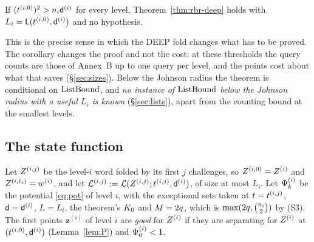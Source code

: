 \begin{corollary}\label{cor:johnson}
If $(t^{(i,0)})^2>n_i\mathsf{d}^{(i)}$ for every level, Theorem~\ref{thm:rbr-deep} holds with $L_i=\mathsf{L}(t^{(i,0)},\mathsf{d}^{(i)})$ and no hypothesis.
\end{corollary}

This is the precise sense in which the DEEP fold changes what has to be proved. The corollary changes the proof and not the cost: at these thresholds the query counts are those of Annex~B up to one query per level, and the points cost about what that saves (\S\ref{sec:sizes}). Below the Johnson radius the theorem is conditional on $\mathrm{ListBound}$, and \emph{no instance of $\mathrm{ListBound}$ below the Johnson radius with a useful $L_i$ is known} (\S\ref{sec:lists}), apart from the counting bound at the smallest levels.

\subsection{The state function}\label{sec:state}

Let $Z^{(i,j)}$ be the level-$i$ word folded by its first $j$ challenges, so $Z^{(i,0)}=Z^{(i)}$ and $Z^{(i,\ell_i)}=w^{(i)}$, and let $\mathcal{L}^{(i,j)}:=\mathcal{L}(Z^{(i,j)};t^{(i,j)},\mathsf{d}^{(i)})$, of size at most $L_i$. Let $\Psi^{(i)}_k$ be the potential \eqref{eq:pot} of level $i$, with the exceptional sets taken at $t=t^{(i,j)}$, $\mathsf{d}=\mathsf{d}^{(i)}$, $L=L_i$, the theorem's $K_0$ and $M=2q$, which is $\max(2q,\binom{n_i}{2})$ by (S3). The first points $\mathbf z^{(i)}$ of level $i$ are \emph{good} for $Z^{(i)}$ if they are separating for $Z^{(i)}$ at $(t^{(i,0)},\mathsf{d}^{(i)})$ (Lemma~\ref{lem:P}) and $\Psi^{(i)}_0<1$.

